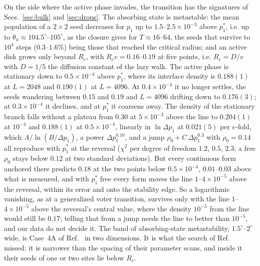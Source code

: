 \documentclass[pre,twocolumn,superscriptaddress,showpacs,floatfix]{revtex4-2}
\begin{document}
On the side where the active phase invades, the transition has the signatures of
Secs.~\ref{sec:bulk} and \ref{sec:drops}. The absorbing state is metastable: the mean population
of a $2\times2$ seed decreases for $p_1$ up to $1.5$--$2.5\times10^{-3}$ above $p_1^*$, i.e. up
to $\theta_a\approx 104.5^\circ$--$105^\circ$, as the closure gives for $T\approx 16$--$64$, the
seeds that survive to $10^4$ steps ($0.3$--$1.6\%$) being those that reached the critical radius;
and an active disk grows only beyond $R_c$, with $R_c v = 0.16$--$0.19$ at five points, i.e.
$R_c = D/v$ with $D = 1/5$ the diffusion constant of the lazy walk. The active phase is
stationary down to $0.5\times10^{-4}$ above $p_1^*$, where its interface density is $0.188(1)$
at $L = 2048$ and $0.190(1)$ at $L = 4096$. At $0.4\times10^{-4}$ it no longer settles, the
seeds wandering between $0.15$ and $0.19$ and $L = 4096$ drifting down to $0.176(3)$; at
$0.3\times10^{-4}$ it declines, and at $p_1^*$ it coarsens away. The density of the stationary
branch falls without a plateau from $0.30$ at $5\times10^{-3}$ above the line to $0.204(1)$ at
$10^{-4}$ and $0.188(1)$ at $0.5\times10^{-4}$, linearly in $\ln\Delta p_1$ at $0.021(5)$ per
$e$-fold, which $A/\ln(B/\Delta p_1)$, a power $\Delta p_1^{0.10}$, and a jump
$\rho_0 + C\,\Delta p_1^{0.3}$ with $\rho_0 = 0.14$ all reproduce with $p_1^*$ at the reversal
($\chi^2$ per degree of freedom $1.2$, $0.5$, $2.3$; a free $\rho_0$ stays below $0.12$ at two
standard deviations). But every continuous form anchored there predicts $0.18$ at the two points
below $0.5\times10^{-4}$, $0.01$--$0.03$ above what is measured, and with $p_1^*$ free every form
moves the line $1$--$4\times10^{-5}$ above the reversal, within its error and onto the stability
edge. So a logarithmic vanishing, as at a generalized voter transition, survives only with the
line $1$--$4\times10^{-5}$ above the reversal's central value, where the density $10^{-5}$ from
the line would still be $0.17$; telling that from a jump needs the line to better than
$10^{-5}$, and our data do not decide it. The band of absorbing-state metastability,
$1.5^\circ$--$2^\circ$ wide, is Case~4A of Ref.~\cite{cox2013} in two dimensions. It is what the
search of Ref.~\cite{molofsky1999} missed: it is narrower than the spacing of their parameter
scans, and inside it their seeds of one or two sites lie below $R_c$.
\end{document}
